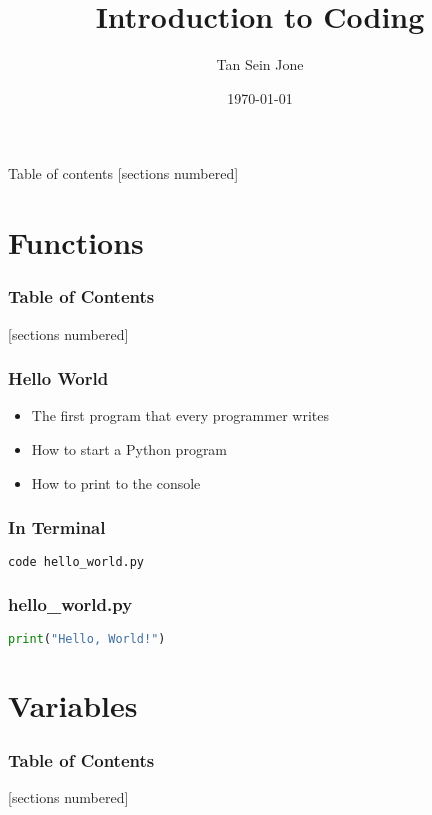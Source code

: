 \documentclass[serif, 9pt, aspectratio=32]{beamer}
\title{Introduction to Coding}
\date{\today}
\author{Tan Sein Jone}
\institute{University of British Columbia}
\begin{document}
\maketitle

\begin{frame}{Table of contents}
    [sections numbered]
    \tableofcontents[hideallsubsections]
\end{frame}

\section{Functions}

\begin{frame}
    \frametitle{Table of Contents}
    [sections numbered]
    \tableofcontents[currentsection]
\end{frame}

\begin{frame}
    \centering
    \frametitle{Hello World}
    \begin{itemize}
        \setlength{\itemsep}{3em}
        \item The first program that every programmer writes
        \item How to start a Python program
        \item How to print to the console
    \end{itemize}
\end{frame}

\begin{frame}[fragile]
    \frametitle{In Terminal}
    \begin{lstlisting}[language=Python]
        code hello_world.py
    \end{lstlisting}
\end{frame}

\begin{frame}[fragile]
    \frametitle{hello\_world.py}
    \begin{lstlisting}[language=Python]
        print("Hello, World!")
    \end{lstlisting}
\end{frame}

\section{Variables}

\begin{frame}
    \frametitle{Table of Contents}
    [sections numbered]
    \tableofcontents[currentsection]
\end{frame}
\end{document}
